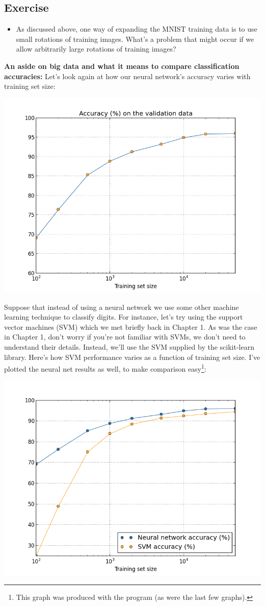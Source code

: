 \documentclass[a4paper,twoside,10pt]{book}
\begin{document}
\subsection*{Exercise}
\begin{itemize}
	\item As discussed above, one way of expanding the MNIST training data is to use small rotations of training images. What's a problem that might occur if we allow arbitrarily large rotations of training images?
\end{itemize}
\textbf{An aside on big data and what it means to compare classification accuracies:} Let's look again at how our neural network's accuracy varies with training set size:
\begin{center}
	\includegraphics[width=0.7\linewidth]{figures/ch3/more_data_log}
\end{center}
Suppose that instead of using a neural network we use some other machine learning technique to classify digits. For instance, let's try using the support vector machines (SVM) which we met briefly back in Chapter 1. As was the case in Chapter 1, don't worry if you're not familiar with SVMs, we don't need to understand their details. Instead, we'll use the SVM supplied by the scikit-learn library. Here's how SVM performance varies as a function of training set size. I've plotted the neural net results as well, to make comparison easy\footnote{This graph was produced with the program  (as were the last few graphs).}:
\begin{center}
	\includegraphics[width=0.7\linewidth]{figures/ch3/more_data_comparison}
\end{center}
\end{document}
